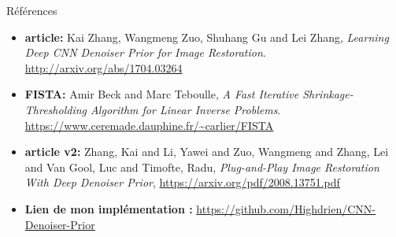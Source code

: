 \documentclass[11pt]{beamer}
\begin{document}
\begin{frame}{Références}
    \begin{itemize}
        \item \textbf{article:} Kai Zhang, Wangmeng Zuo, Shuhang Gu and Lei Zhang, 
            \textit{Learning Deep {CNN} Denoiser Prior for Image Restoration}.
            \url{http://arxiv.org/abs/1704.03264}
        \item \textbf{FISTA:} Amir Beck and Marc Teboulle, \textit{A Fast Iterative Shrinkage-Thresholding 
        Algorithm for Linear Inverse Problems}. \url{https://www.ceremade.dauphine.fr/~carlier/FISTA}
        \item \textbf{article v2:} Zhang, Kai and Li, Yawei and Zuo, Wangmeng and Zhang, Lei and Van Gool, Luc and Timofte, Radu,
            \textit{Plug-and-Play Image Restoration With Deep Denoiser Prior}, \url{https://arxiv.org/pdf/2008.13751.pdf}
        \item \textbf{Lien de mon implémentation :} \url{https://github.com/Highdrien/CNN-Denoiser-Prior}
    \end{itemize}
    
\end{frame}
\end{document}
